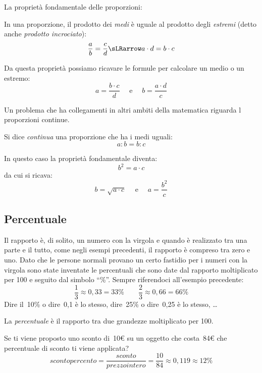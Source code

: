 La proprietà fondamentale delle proporzioni:

\begin{teorema}
 In una proporzione, il prodotto dei \emph{medi} è uguale al prodotto
degli \emph{estremi} (detto anche \emph{prodotto incrociato}):
\[\dfrac{a}{b} = \dfrac{c}{d} \sLRarrow a \cdot d = b \cdot c\]
\end{teorema}

Da questa proprietà possiamo ricavare le formule per calcolare un medio o
un estremo:
\[a = \frac{b \cdot c}{d} \quad \text{ e } \quad
  b = \frac{a \cdot d}{c}\]

Un problema che ha collegamenti in altri ambiti della matematica riguarda l
proporzioni continue.

\begin{definizione}
 Si dice \emph{continua} una proporzione che ha i medi uguali:
 \[a : b = b : c\]
\end{definizione}

In questo caso la proprietà fondamentale diventa:
\[b^2 = a \cdot c\]
da cui si ricava:
\[b = \sqrt{a \cdot c} \quad \text{ e } \quad a = \frac{b^2}{c}\]

\subsection{Percentuale}

Il rapporto è, di solito, un numero con la virgola e
quando è realizzato tra una parte e il tutto, come negli esempi precedenti,
il rapporto è compreso tra zero e uno. Dato che le persone normali provano
un certo fastidio per i numeri con la virgola sono state inventate le
percentuali che sono date dal rapporto moltiplicato per 100 e seguito dal
simbolo ``\%''. Sempre riferendoci all'esempio precedente:
\[\frac{1}{3} \approx 0,33 = 33\% \qquad
  \frac{2}{3} \approx 0,66 = 66\%\]
Dire il~10\% o dire~0,1 è lo stesso,
dire~25\% o dire~0,25 è lo stesso, \dots

\begin{definizione}
 La \emph{percentuale} è il rapporto tra due grandezze moltiplicato per 100.
\end{definizione}

\newpage %

\begin{esempio}
 Se ti viene proposto uno sconto di~10€ su un oggetto che costa~84€ che
percentuale di sconto ti viene applicata?
\[sconto percento = \frac{sconto}{prezzointero}=\frac{10}{84} \approx
  0,119 \approx 12\%\]
\end{esempio}

